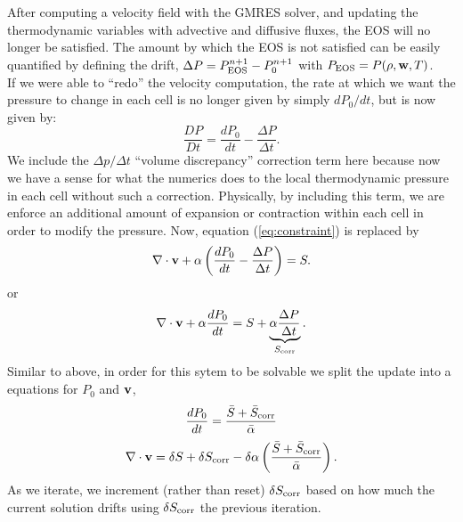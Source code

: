 \documentclass[final]{siamltex}
\def\vb {{\bf v}}
\def\wb {{\bf w}}
\begin{document}
After computing a velocity field with the GMRES solver, and updating the thermodynamic
variables with advective and diffusive fluxes, the EOS will no longer be satisfied.
The amount by which the EOS is not satisfied can be easily quantified by defining
the drift, $\Delta P = P_{\rm EOS}^{n+1} - P_0^{n+1}$ with $P_{\rm EOS} = P(\rho,\wb,T)$.\\

If we were able to ``redo'' the velocity computation, the rate at which we want the 
pressure to change in each cell is no longer given
by simply $dP_0/dt$, but is now given by:
\begin{equation}
\frac{DP}{Dt} = \frac{dP_0}{dt} - \frac{\Delta P}{\Delta t}.
\end{equation}
We include the $\Delta p/\Delta t$ ``volume discrepancy'' correction term here because 
now we have a sense for what the numerics does to the local thermodynamic pressure in 
each cell without such a correction.  Physically, by including this term, we are enforce 
an additional amount of expansion or contraction within each cell in order to modify 
the pressure.  Now, equation (\ref{eq:constraint}) is replaced by
\begin{equation}
\nabla\cdot\vb + \alpha\left(\frac{dP_0}{dt} - \frac{\Delta P}{\Delta t}\right) = S.
\end{equation}
or
\begin{equation}
\nabla\cdot\vb + \alpha\frac{dP_0}{dt} = S + \underbrace{\alpha\frac{\Delta P}{\Delta t}}_{S_{\rm corr}}.
\end{equation}
Similar to above, in order for this sytem to be solvable we split the update into a
equations for $P_0$ and $\vb$,
\begin{equation}
\frac{dP_0}{dt} = \frac{\bar{S} + \bar{S}_{\rm corr}}{\bar{\alpha}}
\end{equation}
\begin{equation}
\nabla\cdot\vb = \delta S + \delta S_{\rm corr} - \delta\alpha\left(\frac{\bar{S} + \bar{S}_{\rm corr}}{\bar{\alpha}}\right).
\end{equation}
As we iterate, we increment (rather than reset) $\delta S_{\rm corr}$ based on how much 
the current solution drifts using $\delta S_{\rm corr}$ the previous iteration.
\end{document}
